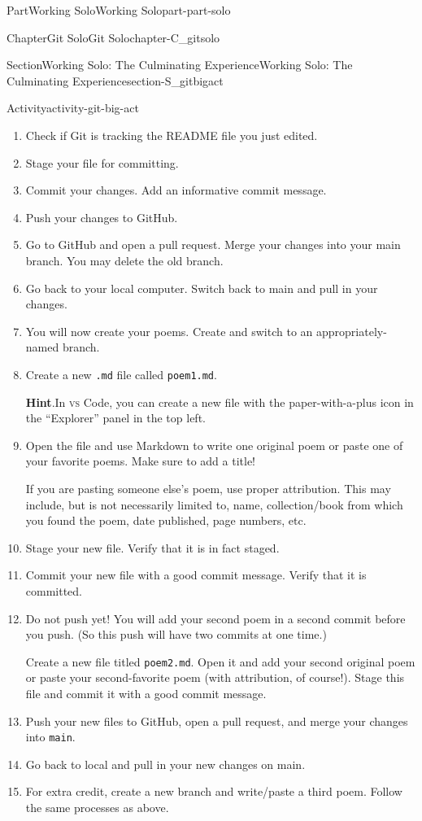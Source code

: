 \documentclass[oneside,10pt,]{book}
\newcommand{\blocktitlefont}{\relax}
\newcommand{\mono}[1]{\texttt{#1}}
\newcommand{\initialism}[1]{\textsc{\MakeLowercase{#1}}}
\begin{document}
\begin{partptx}{Part}{Working Solo}{}{Working Solo}{}{}{part-part-solo}
\begin{chapterptx}{Chapter}{Git Solo}{}{Git Solo}{}{}{chapter-C_gitsolo}
\begin{sectionptx}{Section}{Working Solo: The Culminating Experience}{}{Working Solo: The Culminating Experience}{}{}{section-S_gitbigact}
\begin{activity}{Activity}{}{activity-git-big-act}
\begin{enumerate}[font=\bfseries,label=(\alph*),ref=\alph*]
\item{}Check if Git is tracking the README file you just edited.%
\item{}Stage your file for committing.%
\item{}Commit your changes. Add an informative commit message.%
\item{}Push your changes to GitHub.%
\item{}Go to GitHub and open a pull request. Merge your changes into your main branch. You may delete the old branch.%
\item{}Go back to your local computer. Switch back to main and pull in your changes.%
\item{}You will now create your poems. Create and switch to an appropriately-named branch.%
\item{}Create a new \mono{.md} file called \mono{poem1.md}.%
\par\smallskip%
\noindent\textbf{\blocktitlefont Hint}.\hypertarget{hint-git-big-act-m-b}{}\quad{}In \initialism{VS} Code, you can create a new file with the paper-with-a-plus icon in the ``Explorer'' panel in the top left.%
\item{}Open the file and use Markdown to write one original poem or paste one of your favorite poems. Make sure to add a title!%
\par
If you are pasting someone else's poem, use proper attribution. This may include, but is not necessarily limited to, name, collection\slash{}book from which you found the poem, date published, page numbers, etc.%
\item{}Stage your new file. Verify that it is in fact staged.%
\item{}Commit your new file with a good commit message. Verify that it is committed.%
\item{}Do not push yet! You will add your second poem in a second commit before you push. (So this push will have two commits at one time.)%
\par
Create a new file titled \mono{poem2.md}. Open it and add your second original poem or paste your second-favorite poem (with attribution, of course!). Stage this file and commit it with a good commit message.%
\item{}Push your new files to GitHub, open a pull request, and merge your changes into \mono{main}.%
\item{}Go back to local and pull in your new changes on main.%
\item{}For extra credit, create a new branch and write\slash{}paste a third poem. Follow the same processes as above.%

\end{enumerate}
\end{activity}
\end{sectionptx}
\end{chapterptx}
\end{partptx}
\end{document}
